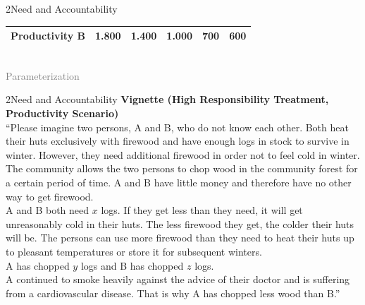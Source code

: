 \documentclass[xcolor=table,9pt,aspectratio=169]{beamer}
\begin{document}
\begin{frame}{\vspace*{10mm}2\hspace*{1em}Need and Accountability}
\begin{center}
\begin{tabular}{lrrrrr}
      Productivity B            &                  1.800    &                  1.400    &                  1.000    &                    700    &                    600    \\
      \hline
   \end{tabular}\\
   \smallskip
   \textcolor{gray}{Parameterization}
\end{center}
\end{frame}


\begin{frame}{\vspace*{10mm}2\hspace*{1em}Need and Accountability}
\textbf{Vignette (High Responsibility Treatment, Productivity Scenario)}\\
\medskip
\enquote{Please imagine two persons, A and B, who do not know each other.
Both heat their huts exclusively with firewood and have enough logs in stock to survive in winter.
However, they need additional firewood in order not to feel cold in winter.
The community allows the two persons to chop wood in the community forest for a certain period of time.
A and B have little money and therefore have no other way to get firewood.\\
\medskip
A and B both need $x$ logs.
If they get less than they need, it will get unreasonably cold in their huts.
The less firewood they get, the colder their huts will be.
The persons can use more firewood than they need to heat their huts up to pleasant temperatures or store it for subsequent winters.\\
\medskip
A has chopped $y$ logs and B has chopped $z$ logs.\\
\medskip
A continued to smoke heavily against the advice of their doctor and is suffering from a cardiovascular disease.
That is why A has chopped less wood than B.}
\end{frame}
\end{document}
